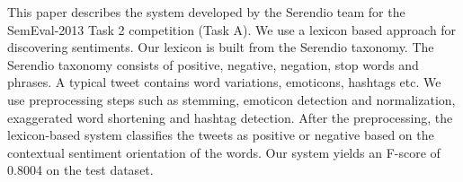 This paper describes the system developed by the Serendio team for the SemEval-2013 Task 2 competition (Task A). We use a lexicon based approach for
 discovering sentiments. Our lexicon is built from the  Serendio taxonomy. The
 Serendio taxonomy consists of positive, negative, negation, stop words and
 phrases. A typical tweet contains word variations, emoticons, hashtags etc. We
 use preprocessing steps such as stemming, emoticon detection and normalization,
 exaggerated word shortening and hashtag detection. After the preprocessing, the
 lexicon-based system classifies the tweets as positive or negative based on the
 contextual sentiment orientation of the words. Our system yields an F-score of
 0.8004 on the test dataset.

